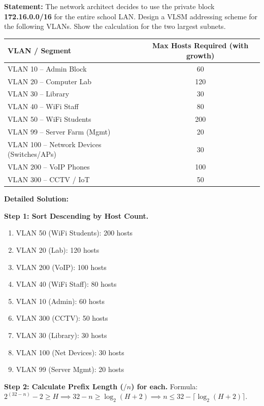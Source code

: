 \documentclass[11pt]{article}
\begin{document}
\begin{exoresolu}
\textbf{Statement:}
The network architect decides to use the private block \textbf{172.16.0.0/16} for the entire school LAN. Design a VLSM addressing scheme for the following VLANs. Show the calculation for the two largest subnets.
\begin{center}
\begin{tabular}{|l|c|}
\hline
\textbf{VLAN / Segment} & \textbf{Max Hosts Required (with growth)} \\
\hline
VLAN 10 -- Admin Block & 60 \\
VLAN 20 -- Computer Lab & 120 \\
VLAN 30 -- Library & 30 \\
VLAN 40 -- WiFi Staff & 80 \\
VLAN 50 -- WiFi Students & 200 \\
VLAN 99 -- Server Farm (Mgmt) & 20 \\
VLAN 100 -- Network Devices (Switches/APs) & 30 \\
VLAN 200 -- VoIP Phones & 100 \\
VLAN 300 -- CCTV / IoT & 50 \\
\hline
\end{tabular}
\end{center}

\tcblower
\textbf{Detailed Solution:}

\noindent\textbf{Step 1: Sort Descending by Host Count.}
\begin{enumerate}
    \item VLAN 50 (WiFi Students): 200 hosts
    \item VLAN 20 (Lab): 120 hosts
    \item VLAN 200 (VoIP): 100 hosts
    \item VLAN 40 (WiFi Staff): 80 hosts
    \item VLAN 10 (Admin): 60 hosts
    \item VLAN 300 (CCTV): 50 hosts
    \item VLAN 30 (Library): 30 hosts
    \item VLAN 100 (Net Devices): 30 hosts
    \item VLAN 99 (Server Mgmt): 20 hosts
\end{enumerate}

\noindent\textbf{Step 2: Calculate Prefix Length ($/n$) for each.}
Formula: $2^{(32-n)} - 2 \ge H \implies 32-n \ge \log_2(H+2) \implies n \le 32 - \lceil \log_2(H+2) \rceil$.


\end{exoresolu}
\end{document}
